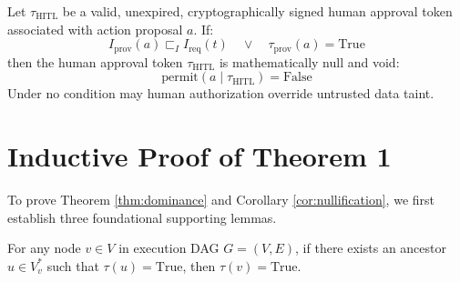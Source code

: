 \begin{corollary}
\label{cor:nullification}
Let $\tau_{\text{HITL}}$ be a valid, unexpired, cryptographically signed human approval token associated with action proposal $a$. If:
\begin{equation}
I_{\text{prov}}(a) \sqsubset_I I_{\text{req}}(t) \quad \lor \quad \tau_{\text{prov}}(a) = \text{True}
\end{equation}
then the human approval token $\tau_{\text{HITL}}$ is mathematically null and void:
\begin{equation}
\text{permit}(a \mid \tau_{\text{HITL}}) = \text{False}
\end{equation}
Under no condition may human authorization override untrusted data taint.
\end{corollary}

\section{Inductive Proof of Theorem 1}
To prove Theorem \ref{thm:dominance} and Corollary \ref{cor:nullification}, we first establish three foundational supporting lemmas.

\begin{lemma}
\label{lem:taint_monotonicity}
For any node $v \in V$ in execution DAG $G = (V, E)$, if there exists an ancestor $u \in V_v^*$ such that $\tau(u) = \text{True}$, then $\tau(v) = \text{True}$.
\end{lemma}


